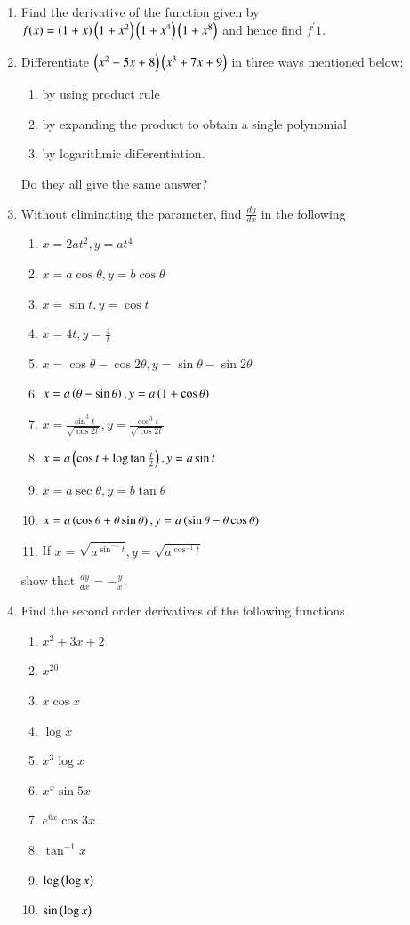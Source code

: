 \begin{enumerate}[label=\arabic*.,ref=\thesubsection.\theenumi]
\item Find the derivative of the function given by 
$
f(x) = \left(1+x\right)\left(1+x^2\right)\left(1+x^4\right)\left(1+x^8\right)
$
and hence find $f^{\prime} 1$.
\item Differentiate 
$
\left(x^2-5x+8\right)\left(x^3+7x+9\right)
$
in three ways mentioned below:
\begin{enumerate}
\item by using product rule
\item by expanding the product to obtain a single polynomial
\item by logarithmic differentiation.
\end{enumerate}
%
Do they all give the same answer?
\item Without eliminating the parameter, find $\frac{dy}{dx}$ in the following
%
\begin{enumerate}
\item
$
x = 2at^2, y = at^4
$
\item
$
x = a\cos\theta, y =b\cos \theta
$
\item
$
x = \sin t, y =\cos t
$
\item
$
x = 4t, y = \frac{4}{t}
$
\item
$
x = \cos \theta - \cos 2\theta, y = \sin \theta  - \sin 2\theta
$
\item
$
x = a \left(\theta - \sin \theta\right), y = a\left(1+\cos \theta\right)
$
\item
$
x = \frac{\sin ^3 t}{\sqrt{\cos 2t}}, y =\frac{\cos ^3 t}{\sqrt{\cos 2t}}
$
\item
$
x = a\left(\cos t + \log \tan \frac{t}{2}\right) , y = a \sin t
$
\item
$
x = a\sec \theta , y = b \tan \theta
$
\item
$
x = a\left(\cos \theta + \theta \sin \theta\right), y = a\left(\sin \theta - \theta \cos \theta\right)
$
\item If 
$
x = \sqrt{a^{\sin^{-1}t}}, y = \sqrt{a^{\cos^{-1}t}}
$
\end{enumerate}
%
show that $\frac{dy}{dx} = -\frac{y}{x}$.
%
\item Find the second order derivatives of the following functions
\begin{enumerate}
\item
$
x^2+3x+2
$
\item
$
x^{20}
$
\item
$
x\cos x
$
\item
$
\log x
$
\item
$
x^3\log x
$
\item
$
x^x\sin 5x
$
\item
$
e^{6x}\cos 3x
$
\item
$
\tan ^{-1}x
$
\item
$
\log \left(\log x\right)
$
\item
$
\sin\left(\log x\right)
$


\end{enumerate}
\end{enumerate}
